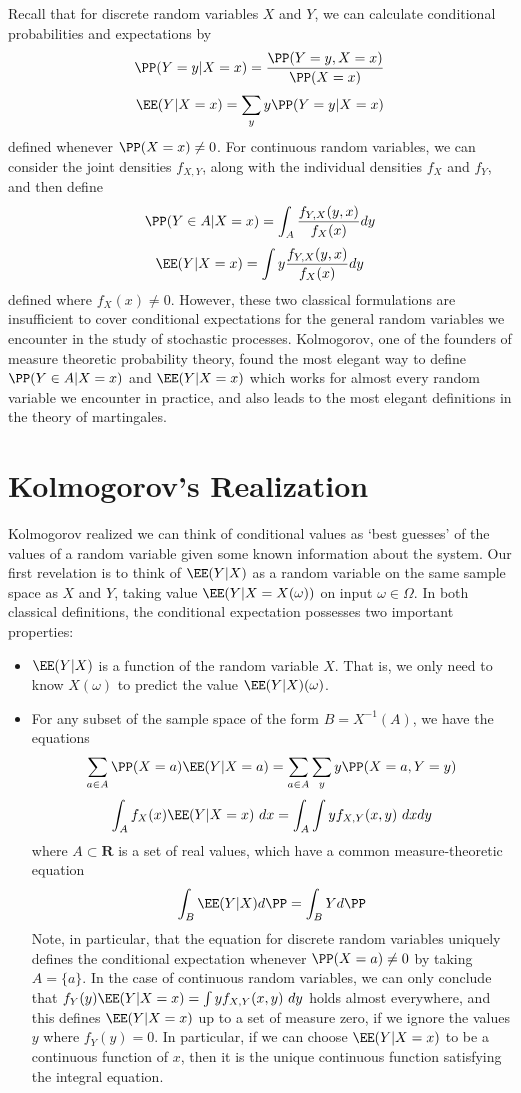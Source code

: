 Recall that for discrete random variables $X$ and $Y$, we can calculate conditional probabilities and expectations by
%
\[ \PP(Y = y | X = x) = \frac{\PP(Y = y, X = x)}{\PP(X = x)} \]
\[ \EE(Y|X = x) = \sum_y y \PP(Y = y|X=x) \]
%
defined whenever $\PP(X = x) \neq 0$. For continuous random variables, we can consider the joint densities $f_{X,Y}$, along with the individual densities $f_X$ and $f_Y$, and then define
%
\[ \PP(Y \in A | X = x) = \int_A \frac{f_{Y,X}(y,x)}{f_X(x)} dy \]
\[ \EE(Y|X = x) = \int y \frac{f_{Y,X}(y,x)}{f_X(x)} dy \]
%
defined where $f_X(x) \neq 0$. However, these two classical formulations are insufficient to cover conditional expectations for the general random variables we encounter in the study of stochastic processes. Kolmogorov, one of the founders of measure theoretic probability theory, found the most elegant way to define $\PP(Y \in A | X = x)$ and $\EE(Y|X=x)$ which works for almost every random variable we encounter in practice, and also leads to the most elegant definitions in the theory of martingales.

\section{Kolmogorov's Realization}

Kolmogorov realized we can think of conditional values as `best guesses' of the values of a random variable given some known information about the system. Our first revelation is to think of $\EE(Y|X)$ as a random variable on the same sample space as $X$ and $Y$, taking value $\EE(Y|X=X(\omega))$ on input $\omega \in \Omega$. In both classical definitions, the conditional expectation possesses two important properties:
%
\begin{itemize}
    \item $\EE(Y|X)$ is a function of the random variable $X$. That is, we only need to know $X(\omega)$ to predict the value $\EE(Y|X)(\omega)$.

    \item For any subset of the sample space of the form $B = X^{-1}(A)$, we have the equations
    \[ \sum_{a \in A} \PP(X = a) \EE(Y|X = a) = \sum_{a \in A} \sum_y y \PP(X = a, Y = y) \]
    \[ \int_A f_X(x) \EE(Y|X=x)\ dx = \int_A \int y f_{X,Y}(x,y)\ dx dy \]
    where $A \subset \mathbf{R}$ is a set of real values, which have a common measure-theoretic equation
    \[ \int_B \EE(Y|X) d\PP = \int_B Y d\PP \]
    Note, in particular, that the equation for discrete random variables uniquely defines the conditional expectation whenever $\PP(X = a) \neq 0$ by taking $A = \{ a \}$. In the case of continuous random variables, we can only conclude that $f_Y(y) \EE(Y|X=x) = \int y f_{X,Y}(x,y)\ dy$ holds almost everywhere, and this defines $\EE(Y|X=x)$ up to a set of measure zero, if we ignore the values $y$ where $f_Y(y) = 0$. In particular, if we can choose $\EE(Y|X=x)$ to be a continuous function of $x$, then it is the unique continuous function satisfying the integral equation.
\end{itemize}


